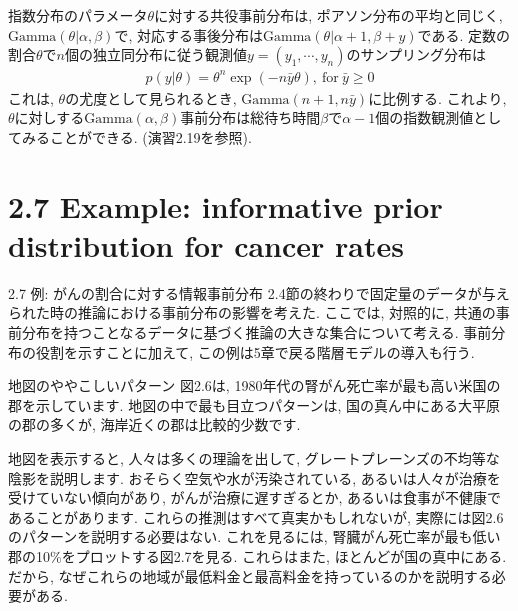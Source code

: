 \documentclass[10pt,dvipdfmx,a4]{beamer}
\newcommand{\eqn}[1]{\begin{align*}#1\end{align*}}
\begin{document}

\begin{frame}
指数分布のパラメータ$\theta$に対する共役事前分布は, ポアソン分布の平均と同じく, $\text{Gamma}(\theta|\alpha,\beta)$で, 対応する事後分布は$\text{Gamma}(\theta|\alpha+1,\beta+y)$である.
定数の割合$\theta$で$n$個の独立同分布に従う観測値$y=(y_1,\cdots,y_n)$のサンプリング分布は
\eqn{p(y|\theta)=\theta^n\exp(-n\bar{y}\theta),\ \text{for}\ \bar{y}\geq 0}
これは, $\theta$の尤度として見られるとき, $\text{Gamma}(n+1,n\bar{y})$に比例する.
これより, $\theta$に対しする$\text{Gamma}(\alpha,\beta)$事前分布は総待ち時間$\beta$で$\alpha-1$個の指数観測値としてみることができる.
(演習2.19を参照).
\end{frame}

\section{2.7 Example: informative prior distribution for cancer rates}
\begin{frame}{2.7 例: がんの割合に対する情報事前分布}
2.4節の終わりで固定量のデータが与えられた時の推論における事前分布の影響を考えた.
ここでは, 対照的に, 共通の事前分布を持つことなるデータに基づく推論の大きな集合について考える.
事前分布の役割を示すことに加えて, この例は5章で戻る階層モデルの導入も行う.
\end{frame}


\begin{frame}{地図のややこしいパターン}
図2.6は, 1980年代の腎がん死亡率が最も高い米国の郡を示しています.
地図の中で最も目立つパターンは, 国の真ん中にある大平原の郡の多くが, 海岸近くの郡は比較的少数です.

地図を表示すると, 人々は多くの理論を出して, グレートプレーンズの不均等な陰影を説明します.
おそらく空気や水が汚染されている, あるいは人々が治療を受けていない傾向があり, がんが治療に遅すぎるとか, あるいは食事が不健康であることがあります.
これらの推測はすべて真実かもしれないが, 実際には図2.6のパターンを説明する必要はない.
これを見るには, 腎臓がん死亡率が最も低い郡の10\%をプロットする図2.7を見る.
これらはまた, ほとんどが国の真中にある.
だから, なぜこれらの地域が最低料金と最高料金を持っているのかを説明する必要がある.
\end{frame}

\end{document}
